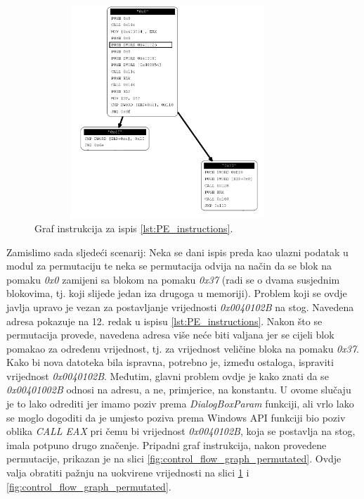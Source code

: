\documentclass[times, utf8, diplomski, numeric]{fer}
\begin{document}
\begin{figure}[!htb]
\centering
\setlength\fboxsep{0pt}
\setlength\fboxrule{0.5pt}
\includegraphics[width=10cm, height=8cm]{slike/permutator_graph_part}
\caption{Graf instrukcija za ispis \ref{lst:PE_instructions}.}
\label{fig:control_flow_graph_pe} 
\end{figure}

Zamislimo sada sljedeći scenarij: Neka se dani ispis
preda kao ulazni podatak u modul za permutaciju te neka se
permutacija odvija na način da se blok na pomaku \emph{0x0}
zamijeni sa blokom na pomaku \emph{0x37} (radi se o dvama
susjednim blokovima, tj. koji slijede jedan iza drugoga u
memoriji).  Problem koji se ovdje javlja upravo je vezan za
postavljanje vrijednosti \emph{0x0040102B} na stog. Navedena
adresa pokazuje na 12. redak u ispisu 
\ref{lst:PE_instructions}. Nakon što se permutacija provede,
navedena adresa više neće biti valjana jer se cijeli blok pomakao
za određenu vrijednost, tj. za vrijednost veličine bloka na
pomaku \emph{0x37}. Kako bi nova datoteka bila ispravna,
potrebno je, između ostaloga, ispraviti vrijednost
\emph{0x0040102B}. Međutim, glavni problem ovdje je kako znati da
se \emph{0x00401002B} odnosi na adresu, a ne, primjerice, na
konstantu. U ovome slučaju je to lako odrediti jer imamo poziv
prema \emph{DialogBoxParam} funkciji, ali vrlo lako se moglo
dogoditi da je umjesto poziva prema Windows API funkciji bio
poziv oblika \emph{CALL EAX} pri čemu bi vrijednost
\emph{0x0040102B}, koja se postavlja na stog, imala potpuno drugo
značenje.  Pripadni graf instrukcija, nakon provedene
permutacije, prikazan je na slici
\ref{fig:control_flow_graph_permutated}. Ovdje valja obratiti
pažnju na uokvirene vrijednosti na slici
\ref{fig:control_flow_graph_pe} i
\ref{fig:control_flow_graph_permutated}.
\end{document}
